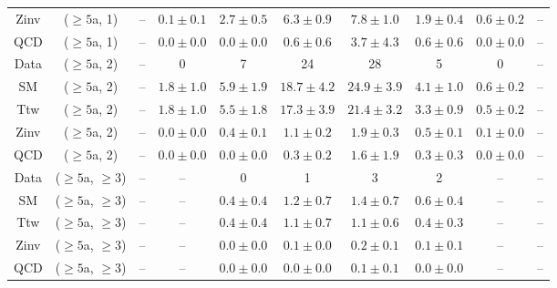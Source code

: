 \begin{table}[h!]
{\begin{tabular}{cccccccccc}
	Zinv & ($\ge5$a, 1) & -- & $0.1\pm 0.1$ & $2.7\pm 0.5$ & $6.3\pm 0.9$ & $7.8\pm 1.0$ & $1.9\pm 0.4$ & $0.6\pm 0.2$ & -- \\[0.5ex] 
	QCD & ($\ge5$a, 1) & -- & $0.0\pm 0.0$ & $0.0\pm 0.0$ & $0.6\pm 0.6$ & $3.7\pm 4.3$ & $0.6\pm 0.6$ & $0.0\pm 0.0$ & -- \\[0.5ex] 
	Data & ($\ge5$a, 2) & -- & 0 & 7 & 24 & 28 & 5 & 0 & -- \\[0.5ex] 
	SM & ($\ge5$a, 2) & -- & $1.8\pm 1.0$ & $5.9\pm 1.9$ & $18.7\pm 4.2$ & $24.9\pm 3.9$ & $4.1\pm 1.0$ & $0.6\pm 0.2$ & -- \\[0.5ex] 
	Ttw & ($\ge5$a, 2) & -- & $1.8\pm 1.0$ & $5.5\pm 1.8$ & $17.3\pm 3.9$ & $21.4\pm 3.2$ & $3.3\pm 0.9$ & $0.5\pm 0.2$ & -- \\[0.5ex] 
	Zinv & ($\ge5$a, 2) & -- & $0.0\pm 0.0$ & $0.4\pm 0.1$ & $1.1\pm 0.2$ & $1.9\pm 0.3$ & $0.5\pm 0.1$ & $0.1\pm 0.0$ & -- \\[0.5ex] 
	QCD & ($\ge5$a, 2) & -- & $0.0\pm 0.0$ & $0.0\pm 0.0$ & $0.3\pm 0.2$ & $1.6\pm 1.9$ & $0.3\pm 0.3$ & $0.0\pm 0.0$ & -- \\[0.5ex] 
	Data & ($\ge5$a, $\ge3$) & -- & -- & 0 & 1 & 3 & 2 & -- & -- \\[0.5ex] 
	SM & ($\ge5$a, $\ge3$) & -- & -- & $0.4\pm 0.4$ & $1.2\pm 0.7$ & $1.4\pm 0.7$ & $0.6\pm 0.4$ & -- & -- \\[0.5ex] 
	Ttw & ($\ge5$a, $\ge3$) & -- & -- & $0.4\pm 0.4$ & $1.1\pm 0.7$ & $1.1\pm 0.6$ & $0.4\pm 0.3$ & -- & -- \\[0.5ex] 
	Zinv & ($\ge5$a, $\ge3$) & -- & -- & $0.0\pm 0.0$ & $0.1\pm 0.0$ & $0.2\pm 0.1$ & $0.1\pm 0.1$ & -- & -- \\[0.5ex] 
	QCD & ($\ge5$a, $\ge3$) & -- & -- & $0.0\pm 0.0$ & $0.0\pm 0.0$ & $0.1\pm 0.1$ & $0.0\pm 0.0$ & -- & -- \\[0.5ex] 
	\hline
	\hline
\end{tabular}}
\end{table}
